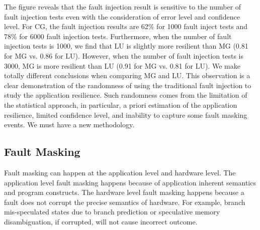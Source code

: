 The figure reveals that the fault injection result is sensitive to the number of fault injection tests even with the consideration of error level and confidence level.
For CG, the fault injection results are 62\% for 1000 fault
inject tests and 78\% for 6000 fault injection tests.
Furthermore, when the number of fault injection tests is 1000, we find that
LU is slightly more resilient than MG (0.81 for MG vs.
0.86 for LU). However, when the number of fault injection
tests is 3000, MG is more resilient than LU (0.91 for MG vs. 0.81 for LU). %
We make totally different conclusions when comparing MG and LU.
This observation is a clear demonstration of the randomness of
using the traditional fault injection to study the application resilience.
Such randomness comes from the limitation of the statistical approach,
in particular, a priori estimation of the application resilience, 
limited confidence level, and inability to capture some fault masking events. 
We must have a new methodology.

\subsection{Fault Masking}
Fault masking can happen at the application level and hardware level.
The application level fault masking happens because of application inherent semantics and program constructs.
The hardware level fault masking happens because a fault does not corrupt the precise semantics of hardware.
For example, branch mis-speculated states due to branch prediction or speculative memory disambiguation, if corrupted, will not cause incorrect outcome.
\begin{comment}
Some fault masking happens because of the effects of both application and hardware.
For example, a cache line with random flipped bits can be evicted out of the cache because of a cache interference.
If the cache line is not written back to the lower level memory hierarchy (e.g., the cache line is clean),
the data corruption in the cache line will not affect the correctness of the application outcome,
hence we have fault masking.
The cache interference is affected by both memory access patterns of the application and the cache features 
(e.g., the cache size, associativity and eviction policy).
Hence, the fault masking in this example is caused by both application and hardware. 
\end{comment}

